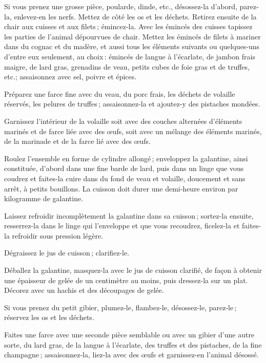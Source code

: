 \sk

Si vous prenez une grosse pièce, poularde, dinde, etc., désossez-la d'abord,
parez-la, enlevez-en les nerfs. Mettez de côté les os et les déchets. Retirez
ensuite de la chair aux cuisses et aux filets ; émincez-la. Avec les émincés
des cuisses tapissez les parties de l'animal dépourvues de chair. Mettez les
émincés de filets à mariner dans du cognac et du madère, et aussi tous les
éléments suivants ou quelques-uns d’entre eux seulement, au choix : émincés de
langue à l'écarlate, de jambon frais maigre, de lard gras, grenadins de veau,
petits cubes de foie gras et de truffes, etc.; assaisonnez avec sel, poivre et
épices.

Préparez une farce fine avec du veau, du porc frais, les déchets de volaille
réservés, les pelures de truffes ; assaisonnez-la et ajoutez-y des pistaches
mondées.

Garnissez l'intérieur de la volaille soit avec des couches alternées d'éléments
marinés et de farce liée avec des œufs, soit avec un mélange des éléments
marinés, de la marinade et de la farce lié avec des œufs.

Roulez l'ensemble en forme de cylindre allongé ; enveloppez la galantine, ainsi
constituée, d'abord dans une fine barde de lard, puis dans un linge que vous
coudrez et faites-la cuire dans du fond de veau et volaille, doucement et sans
arrêt, à petits bouillons. La cuisson doit durer une demi-heure environ par
kilogramme de galantine.

Laissez refroidir incomplètement la galantine dans sa cuisson ; sortez-la
ensuite, resserrez-la dans le linge qui l'enveloppe et que vous recoudrez,
ficelez-la et faites-la refroidir sous pression légère.

Dégraissez le jus de cuisson ; clarifiez-le.

Déballez la galantine, masquez-la avec le jus de cuisson clarifié, de façon
à obtenir une épaisseur de gelée de un centimètre au moins, puis dressez-la sur
un plat. Décorez avec un hachis et des découpages de gelée.

\sk

Si vous prenez du petit gibier, plumez-le, flambez-le, désossez-le, parez-le ;
réservez les os et les déchets.

Faites une farce avec une seconde pièce semblable ou avec un gibier d'une autre
sorte, du lard gras, de la langue à l'écarlate, des truffes et des pistaches,
de la fine champagne ; assaisonnez-la, liez-la avec des œufs et garnissez-en
l'animal désossé.

